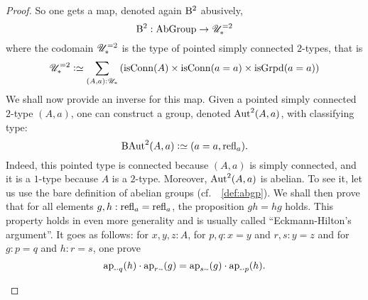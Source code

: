 \begin{proof}
  So one gets a map, denoted again $\mathrm{B}^2$ abusively,
  \begin{displaymath}
    \mathrm{B}^2 : \mathrm{AbGroup} \to {\mathscr{U}}_\ast^{=2} 
  \end{displaymath}
  where the codomain ${\mathscr{U}}_\ast^{=2}$ is the type of pointed simply
  connected $2$-types, that is
  \begin{displaymath}
    \UUsctwo \defequi \sum_{(A,a):\UUp}\left(
      \isconn(A) \times \isconn(a=a) \times \isgrpd(a=a)
    \right)
  \end{displaymath}
  We shall now provide an inverse for this map. Given a pointed simply
  connected $2$-type $(A,a)$, one can construct a group, denoted
  $\mathrm{Aut}^2_{} (A,a)$, with classifying type:
  \begin{displaymath}
    \B\loopspace (A,a) \defequi (a=a,\refl a).
  \end{displaymath}
  Indeed, this pointed type is connected because $(A,a)$ is simply
  connected, and it is a $1$-type because $A$ is a $2$-type. Moreover,
  $\mathrm{Aut}^2_{} (A,a)$ is abelian. To see it, let us use the bare
  definition of abelian groups (cf.\ ~\cref{def:abgp}). We shall then
  prove that for all elements $g,h:\refl a=\refl a$, the proposition
  $gh=hg$ holds. This property holds in even more generality and is
  usually called ``Eckmann-Hilton's argument''. It goes as follows:
  for $x,y,z:A$, for $p,q:x=y$ and $r,s:y=z$ and for $g:p=q$ and
  $h:r=s$, one prove
  \begin{equation}
    \label{eq:horizontal-comp}%
    \ap{\blank\cdot q}(h) \cdot \ap{r\cdot\blank}(g)
    = \ap{s\cdot \blank}(g) \cdot \ap{\blank\cdot p}(h).
  \end{equation}
  \begin{marginfigure}
\end{marginfigure}
\end{proof}
